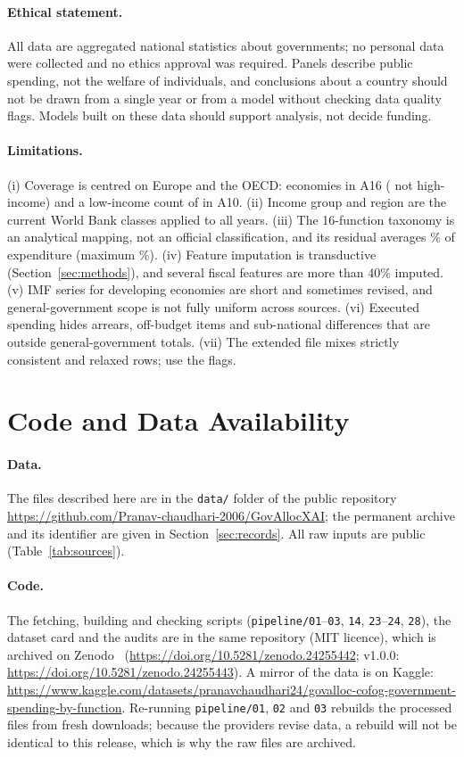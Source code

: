 \documentclass[11pt,a4paper]{article}
\DeclareRobustCommand*{\_}{\textunderscore\hskip0pt\relax}
\begin{document}
\paragraph{Ethical statement.} All data are aggregated national statistics about governments; no personal data were collected and no ethics approval was required. Panels describe public spending, not the welfare of individuals, and conclusions about a country should not be drawn from a single year or from a model without checking data quality flags. Models built on these data should support analysis, not decide funding.
\paragraph{Limitations.} (i) Coverage is centred on Europe and the OECD: \DEconSix{} economies in A16 (\DSixNonHigh{} not high-income) and a low-income count of \DEconTenLo{} in A10. (ii) Income group and region are the current World Bank classes applied to all years. (iii) The 16-function taxonomy is an analytical mapping, not an official classification, and its residual averages \ResidualMean\% of expenditure (maximum \ResidualMax\%). (iv) Feature imputation is transductive (Section~\ref{sec:methods}), and several fiscal features are more than 40\% imputed. (v) IMF series for developing economies are short and sometimes revised, and general-government scope is not fully uniform across sources. (vi) Executed spending hides arrears, off-budget items and sub-national differences that are outside general-government totals. (vii) The extended file mixes strictly consistent and relaxed rows; use the flags.

\section{Code and Data Availability}
\paragraph{Data.} The files described here are in the \texttt{data/} folder of the public repository \url{https://github.com/Pranav-chaudhari-2006/GovAllocXAI}; the permanent archive and its identifier are given in Section~\ref{sec:records}. All raw inputs are public (Table~\ref{tab:sources}).

\paragraph{Code.} The fetching, building and checking scripts (\texttt{pipeline/01}--\texttt{03}, \texttt{14}, \texttt{23}--\texttt{24}, \texttt{28}), the dataset card and the audits are in the same repository (MIT licence), which is archived on Zenodo~\cite{chaudhari2026code} (\url{https://doi.org/10.5281/zenodo.24255442}; v1.0.0: \url{https://doi.org/10.5281/zenodo.24255443}). A mirror of the data is on Kaggle: \url{https://www.kaggle.com/datasets/pranavchaudhari24/govalloc-cofog-government-spending-by-function}. Re-running \texttt{pipeline/01}, \texttt{02} and \texttt{03} rebuilds the processed files from fresh downloads; because the providers revise data, a rebuild will not be identical to this release, which is why the raw files are archived.
\end{document}
